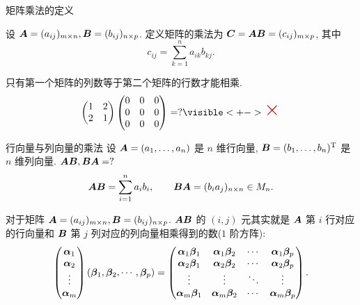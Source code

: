 \begin{frame}{矩阵乘法的定义}
	\onslide<+->
	\begin{definition}[矩阵的乘法]
		设 $\bfA=(a_{ij})_{m\times n}, \bfB=(b_{ij})_{n\times p}$.
		定义矩阵的乘法为  $\bfC=\bfA\bfB=(c_{ij})_{m\times p}$, 其中
		\[c_{ij}=\sum_{k=1}^n a_{ik}b_{kj}.\]
	\end{definition}
	\onslide<+->
	只有第一个矩阵的列数等于第二个矩阵的行数才能相乘.
	\onslide<+->
	\[\begin{pmatrix}
		1&2\\2&1
	\end{pmatrix}\begin{pmatrix}
		0&0&0\\0&0&0\\0&0&0
	\end{pmatrix}=?\visible<+->{\alert{\text{\huge$\times$}}}\]
\end{frame}


\begin{frame}{行向量与列向量的乘法}
	\onslide<+->
	设 $\bfA=(a_1,\dots,a_n)$ 是 $n$ 维行向量, $\bfB=(b_1,\dots,b_n)^\rmT$ 是 $n$ 维列向量.
	\onslide<+->
	$\bfA\bfB,\bfB\bfA=?$
	\onslide<+->
	\[\bfA\bfB=\sum_{i=1}^n a_i b_i,\qquad
	\bfB\bfA=(b_ia_j)_{n\times n}\in M_n.\]

	\onslide<+->
	对于矩阵 $\bfA=(a_{ij})_{m\times n}, \bfB=(b_{ij})_{n\times p}$.
	\onslide<+->
	$\bfA\bfB$ 的 $(i,j)$ 元其实就是 $\bfA$ 第 $i$ 行对应的行向量和 $\bfB$ 第 $j$ 列对应的列向量相乘得到的数($1$ 阶方阵):
	\[\begin{pmatrix}
		\bma_1\\
		\bma_2\\
		\vdots\\
		\bma_m
	\end{pmatrix}(\bmb_1,\bmb_2,\cdots,\bmb_p)=\begin{pmatrix}
		\bma_1\bmb_1&\bma_1\bmb_2&\cdots&\bma_1\bmb_p\\
		\bma_2\bmb_1&\bma_2\bmb_2&\cdots&\bma_2\bmb_p\\
		\vdots&\vdots&\ddots&\vdots\\
		\bma_m\bmb_1&\bma_m\bmb_2&\cdots&\bma_m\bmb_p
	\end{pmatrix}.\]
\end{frame}


